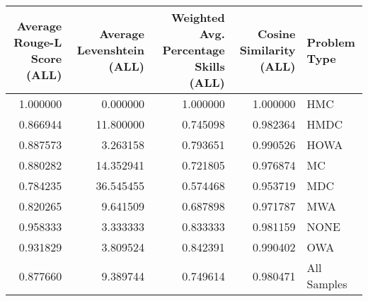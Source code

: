 \begin{tabular}{rrrrl}
\toprule
Average Rouge-L Score (ALL) & Average Levenshtein (ALL) & Weighted Avg. Percentage Skills (ALL) & Cosine Similarity (ALL) & Problem Type \\
\midrule
1.000000 & 0.000000 & 1.000000 & 1.000000 & HMC \\
0.866944 & 11.800000 & 0.745098 & 0.982364 & HMDC \\
0.887573 & 3.263158 & 0.793651 & 0.990526 & HOWA \\
0.880282 & 14.352941 & 0.721805 & 0.976874 & MC \\
0.784235 & 36.545455 & 0.574468 & 0.953719 & MDC \\
0.820265 & 9.641509 & 0.687898 & 0.971787 & MWA \\
0.958333 & 3.333333 & 0.833333 & 0.981159 & NONE \\
0.931829 & 3.809524 & 0.842391 & 0.990402 & OWA \\
0.877660 & 9.389744 & 0.749614 & 0.980471 & All Samples \\
\bottomrule
\end{tabular}
